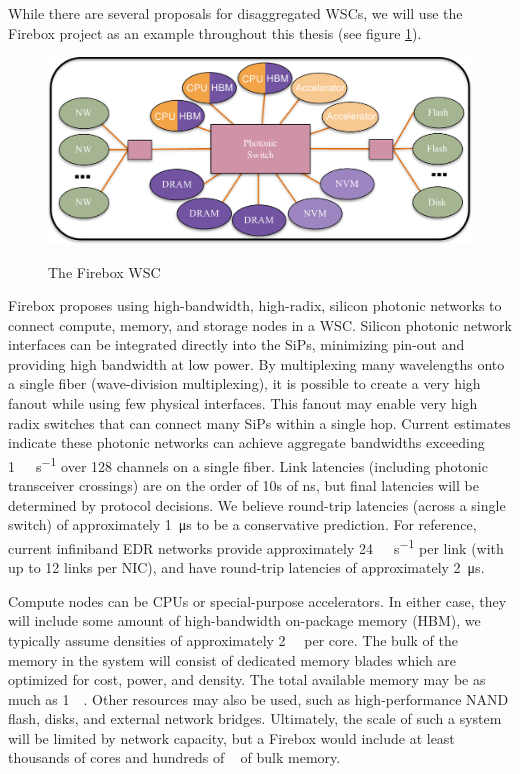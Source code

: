 While there are several proposals for disaggregated WSCs, we will use the
Firebox\cite{firebox} project as an example throughout this thesis (see figure
\ref{fig:fb_diagram}).

\begin{figure}
    \centering
    \includegraphics[width=0.9\columnwidth]{figs/FBDiagram.pdf} \label{fig:fb_diagram}
    \vspace{-5mm}
    \caption{The Firebox WSC}
\end{figure}

Firebox proposes using high-bandwidth, high-radix, silicon photonic networks to
connect compute, memory, and storage nodes in a WSC. Silicon photonic network
interfaces can be integrated directly into the SiPs, minimizing pin-out and
providing high bandwidth at low power. By multiplexing many wavelengths onto a
single fiber (wave-division multiplexing), it is possible to create a very high
fanout while using few physical interfaces. This fanout may enable very high
radix switches that can connect many SiPs within a single hop. Current
estimates indicate these photonic networks can achieve aggregate bandwidths
exceeding \SI{1}{\tera\bit\per\second} over 128 channels on a single
fiber\cite{naturePhotonic}\cite{Photonic09}. Link latencies (including photonic
transceiver crossings) are on the order of 10s of
\si{\nano\second}, but final latencies will
be determined by protocol decisions. We believe round-trip latencies (across a
single switch) of approximately \SI{1}{\micro\second} to be a conservative prediction. For
reference, current infiniband EDR networks provide approximately
\SI{24}{\giga\bit\per\second} per
link (with up to 12 links per NIC), and have round-trip latencies of
approximately \SI{2}{\micro\second}\cite{binnigNW}.

Compute nodes can be CPUs or special-purpose accelerators. In either case, they
will include some amount of high-bandwidth on-package memory (HBM), we
typically assume densities of approximately \SI{2}{\giga\byte} per core. The bulk of the memory
in the system will consist of dedicated memory blades which are optimized for
cost, power, and density. The total available memory may be as much as
\SI{1}{\peta\byte}.
Other resources may also be used, such as high-performance NAND flash, disks,
and external network bridges. Ultimately, the scale of such a system will be
limited by network capacity, but a Firebox would include at least thousands of
cores and hundreds of \si{\tera\byte} of bulk memory.
